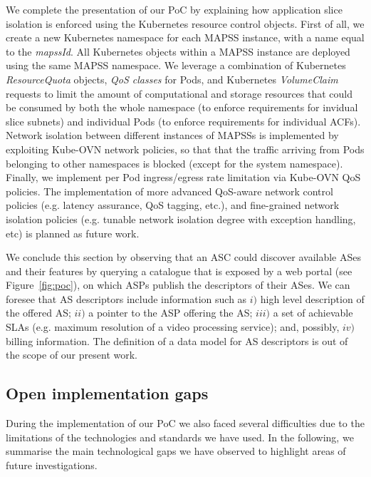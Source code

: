 We complete the presentation of our PoC by explaining how application slice isolation is enforced using the Kubernetes resource control objects. First of all, we create a new Kubernetes namespace for each MAPSS instance, with a name equal to the \textit{mapssId}. All Kubernetes objects within a MAPSS instance are deployed using the same MAPSS namespace. We leverage a combination of Kubernetes \textit{ResourceQuota} objects, \textit{QoS classes} for Pods, and Kubernetes \textit{VolumeClaim} requests to limit the amount of computational and storage resources that could be consumed by both the whole namespace (to enforce requirements for invidual slice subnets) and individual Pods (to enforce requirements for individual ACFs). Network isolation between different instances of MAPSSs is implemented by exploiting Kube-OVN network policies, so that that the traffic arriving from Pods belonging to other namespaces is blocked (except for the system namespace). Finally, we implement per Pod ingress/egress rate limitation via Kube-OVN QoS policies. The implementation of more advanced QoS-aware network control policies (e.g. latency assurance, QoS tagging, etc.), and fine-grained network isolation policies (e.g. tunable network isolation degree with exception handling, etc) is planned as future work.


We conclude this section by  observing that an ASC could discover available ASes and their features by querying a catalogue that is exposed by a web portal (see Figure~\ref{fig:poc}), on which ASPs publish the descriptors of their ASes. We can foresee that AS descriptors include information such as $i)$ high level description of the offered AS; $ii)$ a pointer to the ASP offering the AS; $iii)$ a set of achievable SLAs (e.g. maximum resolution of a video processing service); and, possibly, $iv)$ billing information. The definition of a data model for AS descriptors is out of the scope of our present work. 
%
\subsection{Open implementation gaps}
\label{sec:poc_limitations}
\noindent
%
During the implementation of our PoC we also faced several difficulties due to the limitations of the technologies and standards we have used. In the following, we summarise the main technological gaps we have observed to highlight areas of future investigations.

